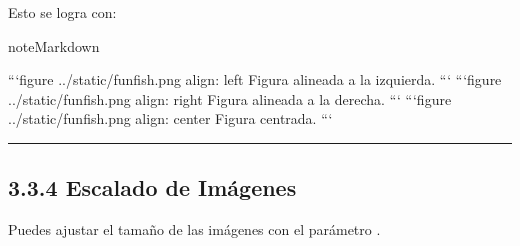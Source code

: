 \documentclass[a4paper,10pt,spanish]{sphinxmanual}
\begin{document}

\sphinxAtStartPar
Esto se logra con:

\begin{sphinxadmonition}{note}{Markdown}

\begin{sphinxVerbatim}[commandchars=\\\{\}]
```\PYGZob{}figure\PYGZcb{} ../\PYGZus{}static/fun\PYGZhy{}fish.png
\PYGZhy{}\PYGZhy{}\PYGZhy{}
align: left
\PYGZhy{}\PYGZhy{}\PYGZhy{}
Figura alineada a la izquierda.
```
```\PYGZob{}figure\PYGZcb{} ../\PYGZus{}static/fun\PYGZhy{}fish.png
\PYGZhy{}\PYGZhy{}\PYGZhy{}
align: right
\PYGZhy{}\PYGZhy{}\PYGZhy{}
Figura alineada a la derecha.
```
```\PYGZob{}figure\PYGZcb{} ../\PYGZus{}static/fun\PYGZhy{}fish.png
\PYGZhy{}\PYGZhy{}\PYGZhy{}
align: center
\PYGZhy{}\PYGZhy{}\PYGZhy{}
Figura centrada.
```


\end{sphinxVerbatim}
\end{sphinxadmonition}


\bigskip\hrule\bigskip



\subsection{3.3.4 Escalado de Imágenes}
\label{\detokenize{3_guia_myst/imagenes_figuras:escalado-de-imagenes}}
\sphinxAtStartPar
Puedes ajustar el tamaño de las imágenes con el parámetro .
\end{document}
